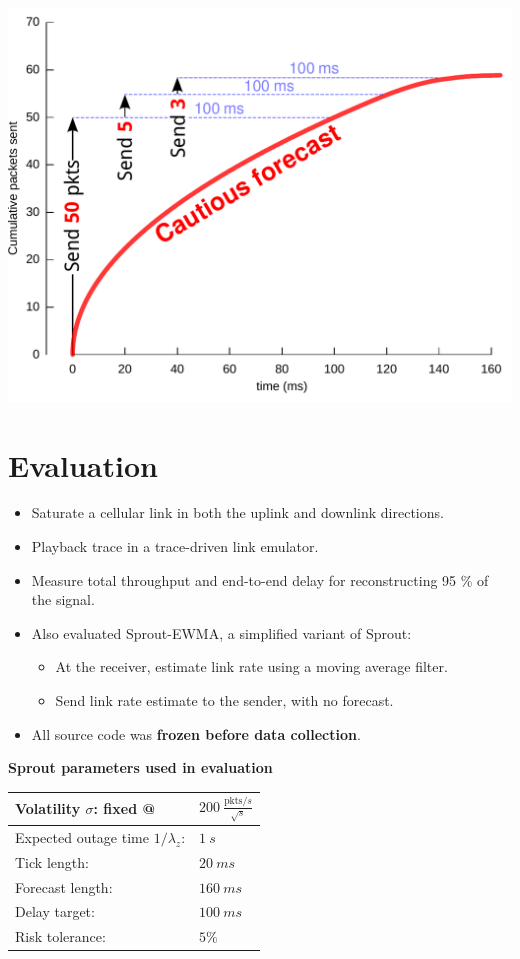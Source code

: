 \begin{multicols}{2}
\begin{centering}
\includegraphics[width=0.75\columnwidth]{forecast-final.pdf}

\end{centering}


\section*{Evaluation}
{\large \bf
\begin{itemize}
\item Saturate a cellular link in both the uplink and downlink directions.
\item Playback trace in a trace-driven link emulator.
\item Measure total throughput and end-to-end delay for reconstructing 95 \% of the signal.
\item Also evaluated Sprout-EWMA, a simplified variant of Sprout:
      \begin{itemize}
      \item At the receiver, estimate link rate using a moving average filter.
      \item Send link rate estimate to the sender, with no forecast.
      \end{itemize}
\item All source code was \textbf{frozen before data collection}.
\end{itemize}
}

{\large \bf
\begin{center}
\textbf{Sprout parameters used in evaluation} \\
\begin{tabular}{|l|l|}
\hline
Volatility $\sigma$: fixed @ & $200~\frac{\textrm{pkts}/s}{\sqrt{s}}$ \\
\hline
Expected outage time $1/\lambda_z$: & $1~s$ \\
\hline
Tick length: & $20~ms$ \\
\hline
Forecast length: & $160~ms$ \\
\hline
Delay target: & $100~ms$ \\
\hline
Risk tolerance: & $5 \%$ \\
\hline
\end{tabular}
\end{center}
}
\vspace{\baselineskip}



\end{multicols}
